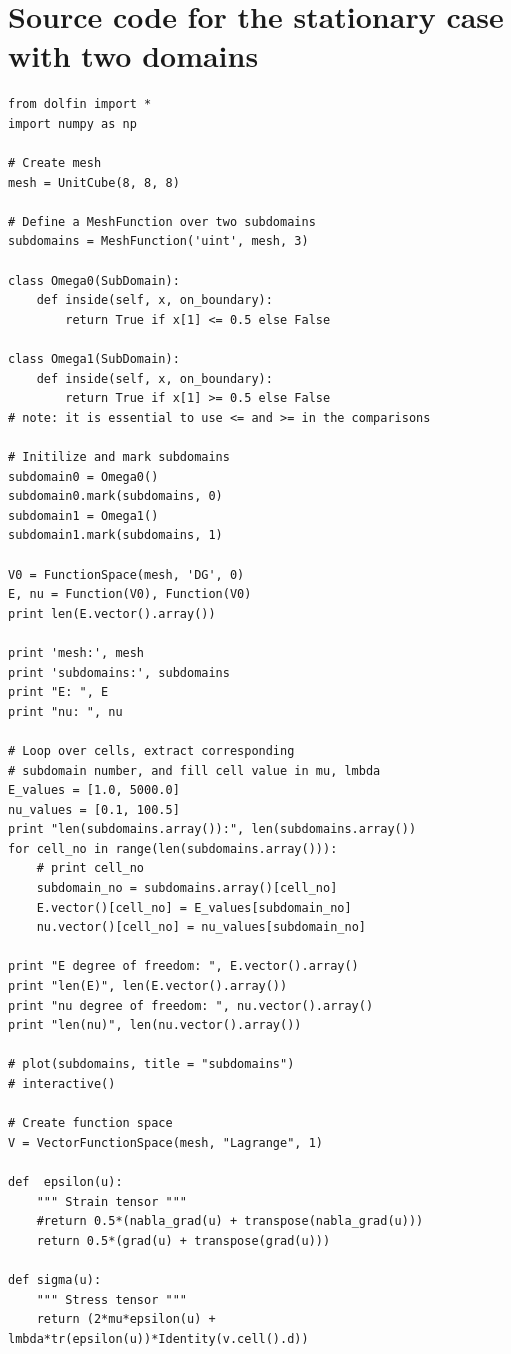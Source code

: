 \documentclass[twoside]{article}
\begin{document}
\section{Source code for the stationary case with two domains}
\label{heterogeneous_medium}
\begin{lstlisting}
from dolfin import *
import numpy as np

# Create mesh
mesh = UnitCube(8, 8, 8)

# Define a MeshFunction over two subdomains
subdomains = MeshFunction('uint', mesh, 3)

class Omega0(SubDomain):
    def inside(self, x, on_boundary):
        return True if x[1] <= 0.5 else False

class Omega1(SubDomain):
    def inside(self, x, on_boundary):
        return True if x[1] >= 0.5 else False
# note: it is essential to use <= and >= in the comparisons

# Initilize and mark subdomains 
subdomain0 = Omega0()
subdomain0.mark(subdomains, 0)
subdomain1 = Omega1()
subdomain1.mark(subdomains, 1)

V0 = FunctionSpace(mesh, 'DG', 0)
E, nu = Function(V0), Function(V0)
print len(E.vector().array())

print 'mesh:', mesh
print 'subdomains:', subdomains
print "E: ", E
print "nu: ", nu 

# Loop over cells, extract corresponding 
# subdomain number, and fill cell value in mu, lmbda
E_values = [1.0, 5000.0]
nu_values = [0.1, 100.5]
print "len(subdomains.array()):", len(subdomains.array())
for cell_no in range(len(subdomains.array())):
	# print cell_no
	subdomain_no = subdomains.array()[cell_no]
	E.vector()[cell_no] = E_values[subdomain_no]
	nu.vector()[cell_no] = nu_values[subdomain_no]

print "E degree of freedom: ", E.vector().array()
print "len(E)", len(E.vector().array())
print "nu degree of freedom: ", nu.vector().array()
print "len(nu)", len(nu.vector().array())

# plot(subdomains, title = "subdomains") 
# interactive()

# Create function space
V = VectorFunctionSpace(mesh, "Lagrange", 1)

def  epsilon(u):
	""" Strain tensor """
	#return 0.5*(nabla_grad(u) + transpose(nabla_grad(u)))
	return 0.5*(grad(u) + transpose(grad(u)))

def sigma(u):
	""" Stress tensor """
	return (2*mu*epsilon(u) + lmbda*tr(epsilon(u))*Identity(v.cell().d))


\end{lstlisting}
\end{document}
